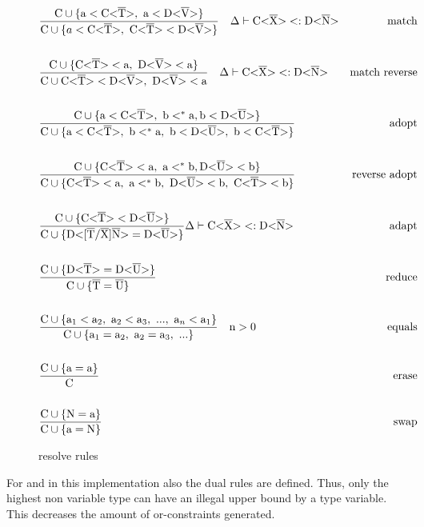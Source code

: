 \begin{figure}[tp]
    \begin{align*}
        &\frac{\cand \{ \text{a} < \nvt{C}{T}, \ \text{a} < \nvt{D}{V} \} }{ \cand \{ a < \nvt{C}{T}, \ \nvt{C}{T} < \nvt{D}{V} \} } \quad \Delta \vdash \nvt{C}{X} <: \nvt{D}{N} &\text{match}\\
        \\
        &\frac{\cand \{ \nvt{C}{T} < \text{a}, \ \nvt{D}{V} < \text{a} \} }{ \cand \nvt{C}{T} < \nvt{D}{V}, \ \nvt{D}{V} < \text{a} } \quad \Delta \vdash \nvt{C}{X} <: \nvt{D}{N} &\text{match reverse}\\
        \\
        &\frac{\cand \{ \text{a} < \nvt{C}{T}, \ \text{b} <^* \text{a}, \text{b} < \nvt{D}{U}  \} }{ \cand \{ \text{a} < \nvt{C}{T}, \ \text{b} <^* \text{a}, \ \text{b} < \nvt{D}{U}, \ \text{b} < \nvt{C}{T} \} } &\text{adopt}\\
        \\
        &\frac{\cand \{ \nvt{C}{T} < \text{a}, \ \text{a} <^* \text{b}, \nvt{D}{U} < \text{b} \} }{ \cand \{\nvt{C}{T} < \text{a}, \ \text{a} <^* \text{b}, \ \nvt{D}{U} < \text{b}, \ \nvt{C}{T} < \text{b} \} } &\text{reverse adopt}\\
        \\
        &\frac{\cand \{ \nvt{C}{T} < \nvt{D}{U} \} }{ \cand \{ \text{D<} \tsxsns{T}{X}{N} \text{>} = \nvt{D}{U} \} } \Delta \vdash \nvt{C}{X} <: \nvt{D}{N} &\text{adapt} \\
        \\
        &\frac{\cand \{ \nvt{D}{T} = \nvt{D}{U} \} }{\cand \{ \ot{T} = \ot{U} \} } &\text{reduce} \\
        \\
        &\frac{\cand \{ \text{a}_1 < \text{a}_2, \ \text{a}_2 < \text{a}_3, \ ..., \ \text{a}_n < \text{a}_1 \} }{\cand \{ \text{a}_1 = \text{a}_2, \ \text{a}_2 = \text{a}_3, \ ... \} } \quad \text{n} > 0 &\text{equals} \\
        \\
        &\frac{\cand \{ \text{a} = \text{a} \} }{\text{C}} &\text{erase} \\
        \\
        &\frac{\cand \{ \text{N} = \text{a} \} }{\cand \{ \text{a} = \text{N} \} } &\text{swap}
    \end{align*}
    \caption{resolve rules}
    \label{resolve_rules}
\end{figure}

For  and  in this implementation also the dual rules are defined.
Thus, only the highest non variable type can have an illegal upper bound by a type variable.
This decreases the amount of or-constraints generated.

